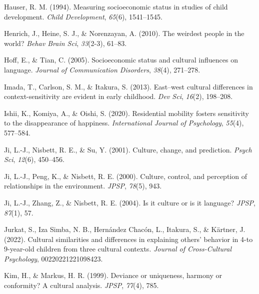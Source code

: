 \documentclass[
  man,floatsintext]{apa6}
\newlength{\cslhangindent}
\newlength{\cslentryspacingunit} %
\newenvironment{CSLReferences}[2] %
 {%
  \setlength{\parindent}{0pt}
  \ifodd #1
  \let\oldpar\par
  \def\par{\hangindent=\cslhangindent\oldpar}
  \fi
  \setlength{\parskip}{#2\cslentryspacingunit}
 }%
 {}
\begin{document}
\begin{CSLReferences}{1}{0}
\leavevmode{}%
Hauser, R. M. (1994). Measuring socioeconomic status in studies of child development. \emph{Child Development}, \emph{65}(6), 1541--1545.

\leavevmode{}%
Henrich, J., Heine, S. J., \& Norenzayan, A. (2010). The weirdest people in the world? \emph{Behav Brain Sci}, \emph{33}(2-3), 61--83.

\leavevmode{}%
Hoff, E., \& Tian, C. (2005). Socioeconomic status and cultural influences on language. \emph{Journal of Communication Disorders}, \emph{38}(4), 271--278.

\leavevmode{}%
Imada, T., Carlson, S. M., \& Itakura, S. (2013). East--west cultural differences in context-sensitivity are evident in early childhood. \emph{Dev Sci}, \emph{16}(2), 198--208.

\leavevmode{}%
Ishii, K., Komiya, A., \& Oishi, S. (2020). Residential mobility fosters sensitivity to the disappearance of happiness. \emph{International Journal of Psychology}, \emph{55}(4), 577--584.

\leavevmode{}%
Ji, L.-J., Nisbett, R. E., \& Su, Y. (2001). Culture, change, and prediction. \emph{Psych Sci}, \emph{12}(6), 450--456.

\leavevmode{}%
Ji, L.-J., Peng, K., \& Nisbett, R. E. (2000). Culture, control, and perception of relationships in the environment. \emph{JPSP}, \emph{78}(5), 943.

\leavevmode{}%
Ji, L.-J., Zhang, Z., \& Nisbett, R. E. (2004). Is it culture or is it language? \emph{JPSP}, \emph{87}(1), 57.

\leavevmode{}%
Jurkat, S., Iza Simba, N. B., Hernández Chacón, L., Itakura, S., \& Kärtner, J. (2022). Cultural similarities and differences in explaining others' behavior in 4-to 9-year-old children from three cultural contexts. \emph{Journal of Cross-Cultural Psychology}, 00220221221098423.

\leavevmode{}%
Kim, H., \& Markus, H. R. (1999). Deviance or uniqueness, harmony or conformity? A cultural analysis. \emph{JPSP}, \emph{77}(4), 785.


\end{CSLReferences}
\end{document}
